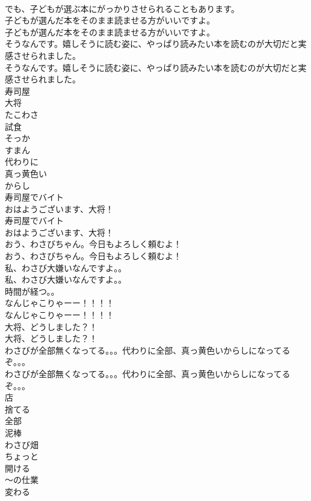 \documentclass[8pt]{extreport}
\begin{document}
\begin{CJK}{UTF8}{min}
\\	でも、子どもが選ぶ本にがっかりさせられることもあります。 
\\	子どもが選んだ本をそのまま読ませる方がいいですよ。	
\\	子どもが選んだ本をそのまま読ませる方がいいですよ。 
\\	そうなんです。嬉しそうに読む姿に、やっぱり読みたい本を読むのが大切だと実感させられました。	
\\	そうなんです。嬉しそうに読む姿に、やっぱり読みたい本を読むのが大切だと実感させられました。 
\\	寿司屋
\\	大将
\\	たこわさ
\\	試食
\\	そっか
\\	すまん
\\	代わりに
\\	真っ黄色い
\\	からし
\\	寿司屋でバイト 
\\	おはようございます、大将！	
\\	寿司屋でバイト 
\\	おはようございます、大将！ 
\\	おう、わさびちゃん。今日もよろしく頼むよ！	
\\	おう、わさびちゃん。今日もよろしく頼むよ！ 
\\	私、わさび大嫌いなんですよ。。	
\\	私、わさび大嫌いなんですよ。。 
\\	時間が経つ。。	
\\	なんじゃこりゃーー！！！！	
\\	なんじゃこりゃーー！！！！ 
\\	大将、どうしました？！	
\\	大将、どうしました？！ 
\\	わさびが全部無くなってる。。。代わりに全部、真っ黄色いからしになってるぞ。。。	
\\	わさびが全部無くなってる。。。代わりに全部、真っ黄色いからしになってるぞ。。。 
\\	店
\\	捨てる
\\	全部
\\	泥棒
\\	わさび畑
\\	ちょっと
\\	開ける
\\	～の仕業
\\	変わる

\end{CJK}
\end{document}
